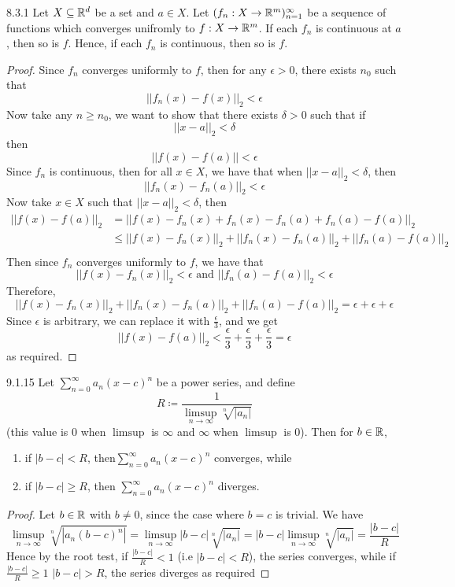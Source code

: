 \documentclass[openany]{report}
\begin{document}
\begin{manualtheorem}{8.3.1}
    Let $X \subseteq \mathbb{R}^d$ be a set and $a \in X$. Let $(f_n: X \rightarrow \mathbb{R}^m)_{n=1}^\infty$ be a sequence of functions which converges unifromly to $f: X \rightarrow \mathbb{R}^m$. If each $f_n$ is continuous at $a$, then so is $f$. Hence, if each $f_n$ is continuous, then so is $f$.
\end{manualtheorem}
\begin{proof}
    Since $f_n$ converges uniformly to $f$, then for any $\epsilon > 0$, there exists $n_0$ such that 
    \[||f_n(x) - f(x)||_2 < \epsilon\]
    Now take any $n \geq n_0$, we want to show that there exists $\delta > 0$ such that if 
    \[||x-a||_2 < \delta\]
    then 
    \[||f(x) - f(a)|| < \epsilon\]
    Since $f_n$ is continuous, then for all $x \in X$, we have that when $||x-a||_2 < \delta$, then
    \[||f_n(x) - f_n(a)||_2 < \epsilon\]
    Now take $x \in X$ such that $||x-a||_2 < \delta$, then
    \begin{align*}
        ||f(x) - f(a)||_2 &= ||f(x) - f_n(x) + f_n(x) - f_n(a) + f_n(a) - f(a)||_2\\
        &\leq ||f(x) - f_n(x)||_2 + ||f_n(x) - f_n(a)||_2 + ||f_n(a) - f(a)||_2\\
    \end{align*}
    Then since $f_n$ converges uniformly to $f$, we have that 
    \[||f(x) - f_n(x)||_2 < \epsilon \text{ and } ||f_n(a) - f(a)||_2 < \epsilon\]
    Therefore,
    \[||f(x) - f_n(x)||_2 + ||f_n(x) - f_n(a)||_2 + ||f_n(a) - f(a)||_2 = \epsilon + \epsilon + \epsilon\]
    Since $\epsilon$ is arbitrary, we can replace it with $\frac{\epsilon}{3}$, and we get 
    \[||f(x) - f(a)||_2 < \frac{\epsilon}{3} + \frac{\epsilon}{3} + \frac{\epsilon}{3} = \epsilon\]
    as required.
\end{proof}

\begin{manualtheorem}{9.1.15}
    Let $\sum\limits_{n=0}^\infty a_n(x-c)^n$ be a power series, and define 
    \[R \coloneqq \frac{1}{\limsup\limits_{n\rightarrow\infty} \sqrt[n]{|a_n|}}\]
    (this value is 0 when $\limsup$ is $\infty$ and $\infty$ when $\limsup$ is 0). Then for $b \in \mathbb{R}$, 
    \begin{enumerate}[label=(\roman*)]
        \item if $|b-c|< R$, then$\sum\limits_{n=0}^\infty a_n(x-c)^n$ converges, while 
        \item if $|b-c| \geq R$, then $\sum\limits_{n=0}^\infty a_n(x-c)^n$ diverges.
    \end{enumerate}
\end{manualtheorem}
\begin{proof}
    Let $b \in \mathbb{R}$ with $b \neq 0$, since the case where $b = c$ is trivial. We have 
    \[\limsup_{n\rightarrow \infty} \sqrt[n]{|a_n(b-c)^n|} = \limsup_{n\rightarrow \infty}|b-c|\sqrt[n]{|a_n|} = |b-c|\limsup_{n\rightarrow \infty}\sqrt[n]{|a_n|}= \frac{|b-c|}{R}\]
    Hence by the root test, if $\frac{|b-c|}{R} < 1$ (i.e $|b-c| < R$), the series converges, while if $\frac{|b-c|}{R} \geq 1$ $|b-c|>R$, the series diverges as required 
\end{proof}
\end{document}
